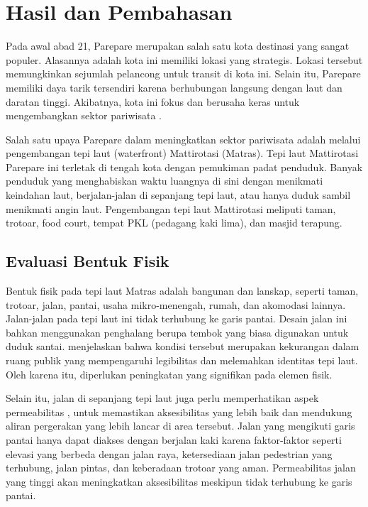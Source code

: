\documentclass[11pt]{simart} %
\begin{document}

\section{Hasil dan Pembahasan}%

Pada awal abad 21, Parepare merupakan salah satu kota destinasi yang sangat populer. Alasannya adalah kota ini memiliki lokasi yang strategis. Lokasi tersebut memungkinkan sejumlah pelancong untuk transit di kota ini. Selain itu, Parepare memiliki daya tarik tersendiri karena berhubungan langsung dengan laut dan daratan tinggi. Akibatnya, kota ini fokus dan berusaha keras untuk mengembangkan sektor pariwisata \citep{faniapriani2018}.

Salah satu upaya Parepare dalam meningkatkan sektor pariwisata adalah melalui pengembangan tepi laut (waterfront) Mattirotasi (Matras). Tepi laut Mattirotasi Parepare ini terletak di tengah kota dengan pemukiman padat penduduk. Banyak penduduk yang menghabiskan waktu luangnya di sini dengan menikmati keindahan laut, berjalan-jalan di sepanjang tepi laut, atau hanya duduk sambil menikmati angin laut. Pengembangan tepi laut Mattirotasi meliputi taman, trotoar, food court, tempat PKL (pedagang kaki lima), dan masjid terapung.

\subsection{Evaluasi Bentuk Fisik}%
\label{sub:Evaluasi Bentuk Fisik}

Bentuk fisik pada tepi laut Matras adalah bangunan dan lanskap, seperti taman, trotoar, jalan, pantai, usaha mikro-menengah, rumah, dan akomodasi lainnya.
Jalan-jalan pada tepi laut ini tidak terhubung ke garis pantai.
Desain jalan ini bahkan menggunakan penghalang berupa tembok yang biasa digunakan untuk duduk santai.
\cite{iqbal2020} menjelaskan bahwa kondisi tersebut merupakan kekurangan dalam ruang publik yang mempengaruhi legibilitas dan melemahkan identitas tepi laut.
Oleh karena itu, diperlukan peningkatan yang signifikan pada elemen fisik.

Selain itu, jalan di sepanjang tepi laut juga perlu memperhatikan aspek permeabilitas \citep{wanismail2018}, untuk memastikan aksesibilitas yang lebih baik dan mendukung aliran pergerakan yang lebih lancar di area tersebut.
Jalan yang mengikuti garis pantai hanya dapat diakses dengan berjalan kaki karena faktor-faktor seperti elevasi yang berbeda dengan jalan raya, ketersediaan jalan pedestrian yang terhubung, jalan pintas, dan keberadaan trotoar yang aman.
Permeabilitas jalan yang tinggi akan meningkatkan aksesibilitas meskipun tidak terhubung ke garis pantai.
\end{document}
